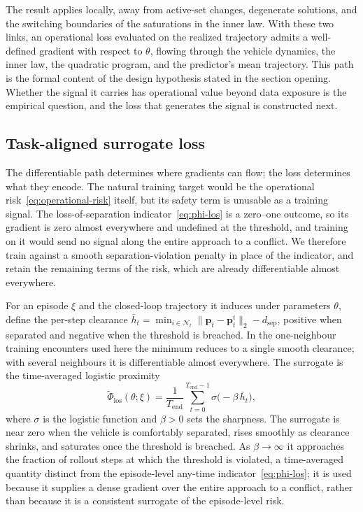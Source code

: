 \documentclass[11pt]{article}
\theoremstyle{plain}
\theoremstyle{definition}
\begin{document}
The result applies locally, away from active-set changes, degenerate
solutions, and the switching boundaries of the saturations in the
inner law. With these two links, an
operational loss evaluated on the realized trajectory admits a
well-defined gradient with respect to $\theta$, flowing through the
vehicle dynamics, the inner law, the quadratic program, and the
predictor's mean trajectory. This path is the formal content of the
design hypothesis stated in the section opening. Whether the signal
it carries has operational value beyond data exposure is the empirical
question, and the loss that generates the signal is constructed next.
 
\subsection{Task-aligned surrogate loss}
\label{sec:method-tasl}
 
The differentiable path determines where gradients can flow; the loss
determines what they encode. The natural training target would be the
operational risk~\eqref{eq:operational-risk} itself, but its safety
term is unusable as a training signal. The loss-of-separation
indicator~\eqref{eq:phi-los} is a zero--one outcome, so its gradient
is zero almost everywhere and undefined at the threshold, and training
on it would send no signal along the entire approach to a conflict. We
therefore train against a smooth separation-violation penalty in place
of the indicator, and retain the remaining terms of the risk, which
are already differentiable almost everywhere.
 
For an episode $\xi$ and the closed-loop trajectory it induces under
parameters $\theta$, define the per-step clearance
$\bar h_t = \min_{i \in \mathcal{N}_t}
	\| \bm{p}_t - \bm{p}^{i}_t \|_2 - d_{\mathrm{sep}}$, positive when
separated and negative when the threshold is breached. In the
one-neighbour training encounters used here the minimum reduces to a
single smooth clearance; with several neighbours it is differentiable
almost everywhere. The surrogate is the time-averaged logistic
proximity
\begin{equation}
	\label{eq:soft-los}
	\widetilde\Phi_{\mathrm{los}}(\theta; \xi)
	= \frac{1}{T_{\mathrm{end}}} \sum_{t=0}^{T_{\mathrm{end}} - 1}
	\sigma\big( -\beta\, \bar h_t \big),
\end{equation}
where $\sigma$ is the logistic function and $\beta > 0$ sets the
sharpness. The surrogate is near zero when the vehicle is comfortably
separated, rises smoothly as clearance shrinks, and saturates once the
threshold is breached. As $\beta \to \infty$ it approaches the
fraction of rollout steps at which the threshold is violated, a
time-averaged quantity distinct from the episode-level any-time
indicator~\eqref{eq:phi-los}; it is used because it supplies a dense
gradient over the entire approach to a conflict, rather than because
it is a consistent surrogate of the episode-level risk.
 
\end{document}
